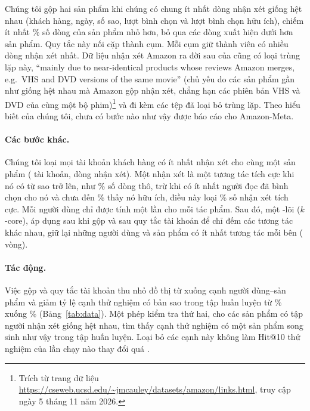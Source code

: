 Chúng tôi gộp hai sản phẩm khi chúng có chung ít nhất  dòng nhận xét giống
hệt nhau (khách hàng, ngày, số sao, lượt bình chọn và lượt bình chọn hữu ích), chiếm ít nhất
\% số dòng của sản phẩm nhỏ hơn, bỏ qua các dòng xuất hiện dưới hơn
 sản phẩm. Quy tắc này nối  cặp thành
 cụm. Mỗi cụm giữ thành viên có nhiều dòng nhận xét nhất. Dữ liệu nhận xét
Amazon ra đời sau của \citet{mcauley2015image} cũng có loại trùng lặp này,
``\foreignlanguage{english}{mainly due to near-identical products whose reviews Amazon merges,
e.g.\ VHS and DVD versions of the same movie}'' (chủ yếu do các sản phẩm gần như giống hệt nhau mà
Amazon gộp nhận xét, chẳng hạn các phiên bản VHS và DVD của cùng một bộ phim)\footnote{Trích từ trang
dữ liệu \url{https://cseweb.ucsd.edu/~jmcauley/datasets/amazon/links.html}, truy cập ngày 5 tháng 11
năm 2026.} và đi kèm các tệp đã loại bỏ trùng lặp. Theo hiểu biết của chúng tôi, chưa có bước nào như
vậy được báo cáo cho Amazon-Meta.

\paragraph{Các bước khác.} Chúng tôi loại mọi tài khoản khách hàng có ít nhất
 nhận xét cho cùng một sản phẩm ( tài khoản,
 dòng nhận xét). Một nhận xét là một tương tác tích cực khi nó có từ
 sao trở lên, như \% số dòng thô, trừ khi có ít nhất
 người đọc đã bình chọn cho nó và chưa đến \% thấy
nó hữu ích, điều này loại \% số nhận xét tích cực. Mỗi người dùng chỉ được
tính một lần cho mỗi tác phẩm. Sau đó, một -lõi ($k$-core), áp dụng sau khi gộp và
sau quy tắc tài khoản để chỉ đếm các tương tác khác nhau, giữ lại những người dùng và sản phẩm có
ít nhất  tương tác mỗi bên ( vòng).



\paragraph{Tác động.} Việc gộp và quy tắc tài khoản thu nhỏ đồ thị từ  xuống
 cạnh người dùng--sản phẩm và giảm tỷ lệ cạnh thử nghiệm có bản sao trong tập huấn
luyện từ \% xuống \% (Bảng~\ref{tab:data}). Một
phép kiểm tra thứ hai, cho các sản phẩm có tập người nhận xét giống hệt nhau, tìm thấy
 cạnh thử nghiệm có một sản phẩm song sinh như vậy trong tập huấn luyện. Loại bỏ các
cạnh này không làm Hit@10 thử nghiệm của lần chạy nào thay đổi quá .


